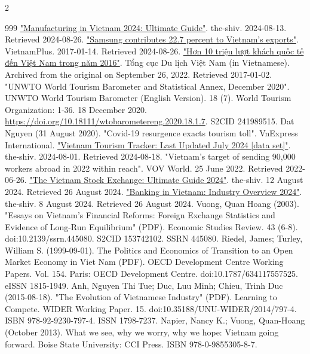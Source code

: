 \documentclass[openany]{book}
\begin{document}
\begin{multicols}{2}
\begin{thebibliography}{999}
 \href{https://the-shiv.com/manufacturing-in-vietnam/}{"Manufacturing in Vietnam 2024: Ultimate Guide"}. the-shiv. 2024-08-13. Retrieved 2024-08-26.
 \href{https://en.vietnamplus.vn/samsung-contributes-227-percent-to-vietnams-exports-post105838.vnp}{"Samsung contributes 22.7 percent to Vietnam's exports"}. VietnamPlus. 2017-01-14. Retrieved 2024-08-26.
 \href{https://web.archive.org/web/20220926221526/https://vietnamtourism.gov.vn/items/22311}{"Hơn 10 triệu lượt khách quốc tế đến Việt Nam trong năm 2016"}. Tổng cục Du lịch Việt Nam (in Vietnamese). Archived from the original on September 26, 2022. Retrieved 2017-01-02.
 "UNWTO World Tourism Barometer and Statistical Annex, December 2020". UNWTO World Tourism Barometer (English Version). 18 (7). World Tourism Organization: 1-36. 18 December 2020. \url{https://doi.org/10.18111/wtobarometereng.2020.18.1.7}. S2CID 241989515.
 Dat Nguyen (31 August 2020). "Covid-19 resurgence exacts tourism toll". VnExpress International.
 \href{https://the-shiv.com/vietnam-tourism-data/}{"Vietnam Tourism Tracker: Last Updated July 2024 [data set]"}. the-shiv. 2024-08-01. Retrieved 2024-08-18.
 "Vietnam's target of sending 90,000 workers abroad in 2022 within reach". VOV World. 25 June 2022. Retrieved 2022-06-26.
 \href{https://the-shiv.com/the-vietnam-stock-exchange-quick-guide/}{"The Vietnam Stock Exchange: Ultimate Guide 2024"}. the-shiv. 12 August 2024. Retrieved 26 August 2024.
 \href{https://the-shiv.com/banking-in-vietnam-industry-overview/}{"Banking in Vietnam: Industry Overview 2024"}. the-shiv. 8 August 2024. Retrieved 26 August 2024.
 Vuong, Quan Hoang (2003). "Essays on Vietnam's Financial Reforms: Foreign Exchange Statistics and Evidence of Long-Run Equilibrium" (PDF). Economic Studies Review. 43 (6-8). doi:10.2139/ssrn.445080. S2CID 153742102. SSRN 445080.
 Riedel, James; Turley, William S. (1999-09-01). The Politics and Economics of Transition to an Open Market Economy in Viet Nam (PDF). OECD Development Centre Working Papers. Vol. 154. Paris: OECD Development Centre. doi:10.1787/634117557525. eISSN 1815-1949.
 Anh, Nguyen Thi Tue; Duc, Luu Minh; Chieu, Trinh Duc (2015-08-18). "The Evolution of Vietnamese Industry" (PDF). Learning to Compete. WIDER Working Paper. 15. doi:10.35188/UNU-WIDER/2014/797-4. ISBN 978-92-9230-797-4. ISSN 1798-7237.
 Napier, Nancy K.; Vuong, Quan-Hoang (October 2013). What we see, why we worry, why we hope: Vietnam going forward. Boise State University: CCI Press. ISBN 978-0-9855305-8-7.

\end{thebibliography}
\end{multicols}
\end{document}
